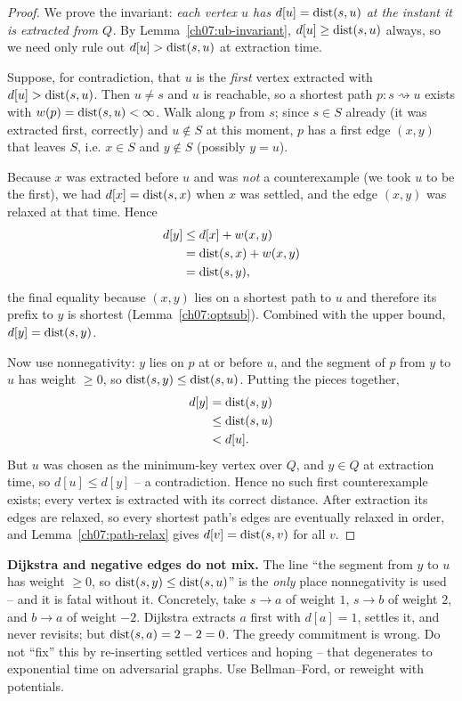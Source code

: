 \begin{proof}
We prove the invariant: \emph{each vertex $u$ has $d[u]=\operatorname{dist}(s,u)$ at the instant it is
extracted from $Q$.} By Lemma~\ref{ch07:ub-invariant}, $d[u]\ge\operatorname{dist}(s,u)$ always, so we
need only rule out $d[u]>\operatorname{dist}(s,u)$ at extraction time.

Suppose, for contradiction, that $u$ is the \emph{first} vertex extracted with
$d[u]>\operatorname{dist}(s,u)$. Then $u\neq s$ and $u$ is reachable, so a shortest path
$p\colon s\rightsquigarrow u$ exists with $w(p)=\operatorname{dist}(s,u)<\infty$. Walk along $p$ from $s$;
since $s\in S$ already (it was extracted first, correctly) and $u\notin S$ at this moment,
$p$ has a first edge $(x,y)$ that leaves $S$, i.e. $x\in S$ and $y\notin S$ (possibly
$y=u$).

Because $x$ was extracted before $u$ and was \emph{not} a counterexample (we took $u$ to be
the first), we had $d[x]=\operatorname{dist}(s,x)$ when $x$ was settled, and the edge $(x,y)$ was relaxed
at that time. Hence
\begin{align*}
   d[y] &\le d[x]+w(x,y) \\
        &= \operatorname{dist}(s,x)+w(x,y) \\
        &= \operatorname{dist}(s,y),
\end{align*}
the final equality because $(x,y)$ lies on a shortest path to $u$ and therefore its prefix
to $y$ is shortest (Lemma~\ref{ch07:optsub}). Combined with the upper bound, $d[y]=
\operatorname{dist}(s,y)$.

Now use nonnegativity: $y$ lies on $p$ at or before $u$, and the segment of $p$ from $y$ to
$u$ has weight $\ge 0$, so $\operatorname{dist}(s,y)\le\operatorname{dist}(s,u)$. Putting the pieces together,
\begin{align*}
   d[y] &= \operatorname{dist}(s,y) \\
        &\le \operatorname{dist}(s,u) \\
        &< d[u].
\end{align*}
But $u$ was chosen as the minimum-key vertex over $Q$, and $y\in Q$ at extraction time, so
$d[u]\le d[y]$ -- a contradiction. Hence no such first counterexample exists; every vertex
is extracted with its correct distance. After extraction its edges are relaxed, so every
shortest path's edges are eventually relaxed in order, and
Lemma~\ref{ch07:path-relax} gives $d[v]=\operatorname{dist}(s,v)$ for all $v$.
\end{proof}

\begin{trapbox}
\textbf{Dijkstra and negative edges do not mix.} The line ``the segment from $y$ to $u$ has
weight $\ge 0$, so $\operatorname{dist}(s,y)\le\operatorname{dist}(s,u)$'' is the \emph{only} place nonnegativity is
used -- and it is fatal without it. Concretely, take $s\to a$ of weight $1$, $s\to b$ of
weight $2$, and $b\to a$ of weight $-2$. Dijkstra extracts $a$ first with $d[a]=1$, settles
it, and never revisits; but $\operatorname{dist}(s,a)=2-2=0$. The greedy commitment is wrong. Do not
``fix'' this by re-inserting settled vertices and hoping -- that degenerates to exponential
time on adversarial graphs. Use Bellman--Ford, or reweight with potentials.
\end{trapbox}

